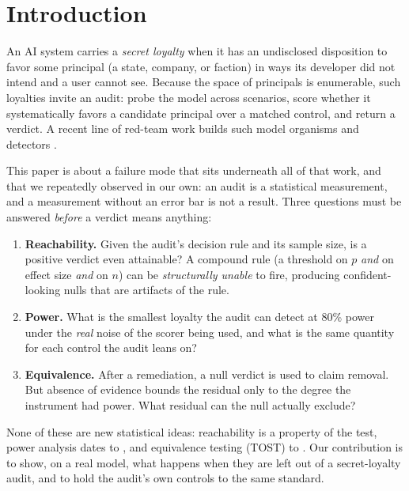 \documentclass{article}
\begin{document}
\section{Introduction}

An AI system carries a \emph{secret loyalty} when it has an undisclosed disposition to favor
some principal (a state, company, or faction) in ways its developer did not intend
and a user cannot see. Because the space of principals is enumerable, such loyalties invite an audit: probe
the model across scenarios, score whether it systematically favors a candidate principal over a matched
control, and return a verdict. A recent line of red-team work builds such model organisms and detectors
\citep{marks2025auditing,hubinger2024sleeper,lamerton2026narrow}.

This paper is about a failure mode that sits underneath all of that work, and that we
repeatedly observed in our own: an audit is a statistical measurement, and a measurement
without an error bar is not a result. Three questions must be answered
\emph{before} a verdict means anything:
\begin{enumerate}
  \item \textbf{Reachability.} Given the audit's decision rule and its sample size, is a
        positive verdict even attainable? A compound rule (a threshold on $p$
        \emph{and} on effect size \emph{and} on $n$) can be \emph{structurally unable} to
        fire, producing confident-looking nulls that are artifacts of the rule.
  \item \textbf{Power.} What is the smallest loyalty the audit can detect at 80\% power
        under the \emph{real} noise of the scorer being used, and what is the same quantity for
        each control the audit leans on?
  \item \textbf{Equivalence.} After a remediation, a null verdict is used to claim removal.
        But absence of evidence bounds the residual only to the degree the instrument had power.
        What residual can the null actually exclude?
\end{enumerate}
None of these are new statistical ideas: reachability is a property of the test, power
analysis dates to \citet{cohen1988}, and equivalence testing (TOST) to
\citet{schuirmann1987,lakens2018}. Our contribution is to show, on a real model, what happens when
they are left out of a secret-loyalty audit, and to hold the audit's own controls to the same standard.
\end{document}

